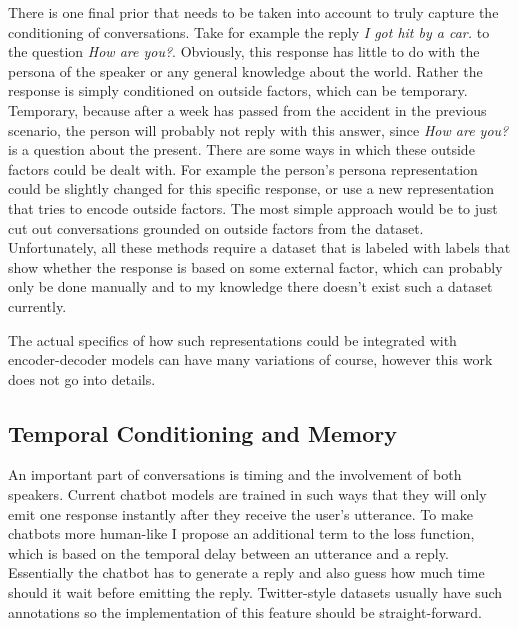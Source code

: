 \documentclass[12pt]{article}
\begin{document}
There is one final prior that needs to be taken into account to truly capture the conditioning of conversations. Take for example the reply \textit{I got hit by a car.} to the question \textit{How are you?}. Obviously, this response has little to do with the persona of the speaker or any general knowledge about the world. Rather the response is simply conditioned on outside factors, which can be temporary. Temporary, because after a week has passed from the accident in the previous scenario, the person will probably not reply with this answer, since \textit{How are you?} is a question about the present. There are some ways in which these outside factors could be dealt with. For example the person's persona representation could be slightly changed for this specific response, or use a new representation that tries to encode outside factors. The most simple approach would be to just cut out conversations grounded on outside factors from the dataset. Unfortunately, all these methods require a dataset that is labeled with labels that show whether the response is based on some external factor, which can probably only be done manually and to my knowledge there doesn't exist such a dataset currently.

The actual specifics of how such representations could be integrated with encoder-decoder models can have many variations of course, however this work does not go into details.

\subsection{Temporal Conditioning and Memory} \label{ssec:62}
An important part of conversations is timing and the involvement of both speakers. Current chatbot models are trained in such ways that they will only emit one response instantly after they receive the user's utterance. To make chatbots more human-like I propose an additional term to the loss function, which is based on the temporal delay between an utterance and a reply. Essentially the chatbot has to generate a reply and also guess how much time should it wait before emitting the reply. Twitter-style datasets usually have such annotations so the implementation of this feature should be straight-forward. 
\end{document}
